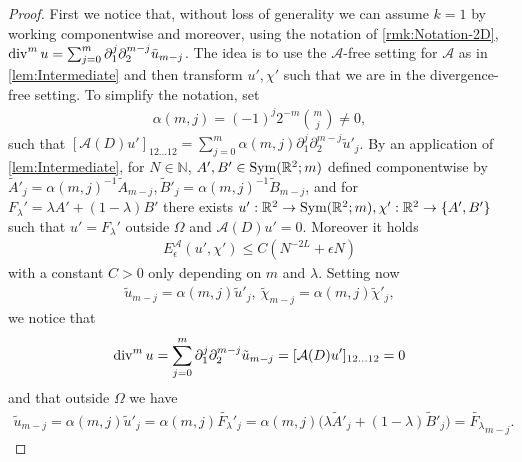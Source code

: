 \documentclass[a4paper, 10pt, twoside, notitlepage]{amsart}
\theoremstyle{plain}
\newcommand{\R}{\mathbb{R}}
\newcommand{\N}{\mathbb{N}}
\newcommand{\p}{\partial}
\newcommand{\A}{\mathcal{A}}
\begin{document}
                  \begin{proof}
                    First we notice that, without loss of generality we can assume $k=1$ by working componentwise and moreover, using the notation of \cref{rmk:Notation-2D}, $\di^m u = \sum_{j=0}^m \p_1^j \p_2^{m-j} \tilde{u}_{m-j}$.
                    The idea is to use the $\A$-free setting for $\A$ as in \cref{lem:Intermediate} and then transform $u',\chi'$ such that we are in the divergence-free setting.
                    To simplify the notation, set
                    \begin{align*}
                      \alpha(m,j) = (-1)^j 2^{-m} \binom{m}{j} \neq 0,
                    \end{align*}
                    such that $[\A(D)u']_{12\dots12} = \sum_{j=0}^m \alpha(m,j) \p_1^j \p_2^{m-j} \tilde{u}'_j$. 
                    By an application of \cref{lem:Intermediate}, for $N \in \N$, $A',B' \in \textup{Sym}(\R^2;m)$ defined componentwise by $\tilde{A}'_j = \alpha(m,j)^{-1} \tilde{A}_{m-j}, \tilde{B}'_j = \alpha(m,j)^{-1} \tilde{B}_{m-j}$, and for $F_\lambda' = \lambda A' + (1-\lambda) B'$ there exists $u':\R^2 \to \textup{Sym}(\R^2;m), \chi':\R^2 \to \{A',B'\}$ such that $u' = F_\lambda'$ outside $\Omega$ and $\A(D)u' = 0$.
                    Moreover it holds 
                    \begin{align*}
                      E_\epsilon^{\A}(u',\chi') \leq C (N^{-2L} + \epsilon N)
                    \end{align*}
                    with a constant $C > 0$ only depending on $m$ and $\lambda$.
                    Setting now
                    \begin{align*}
                      \tilde{u}_{m-j} = \alpha(m,j) \tilde{u}'_j, \ \tilde{\chi}_{m-j} = \alpha(m,j) \tilde{\chi}'_j,
                    \end{align*}
                    we notice that
                    \begin{align*}
                      \di^m u = \sum_{j=0}^m \p_1^j \p_2^{m-j} \tilde{u}_{m-j} = [\A(D)u']_{12 \dots 12} = 0
                    \end{align*}
                    and that outside $\Omega$ we have
                    \begin{align*}
                      \tilde{u}_{m-j} = \alpha(m,j) \tilde{u}'_j = \alpha(m,j) \tilde{F_\lambda}'_j = \alpha(m,j) \Big( \lambda \tilde{A}'_j + (1-\lambda) \tilde{B}'_j \Big) = \tilde{F_\lambda}_{m-j}.
                    \end{align*}

\end{proof}
\end{document}
